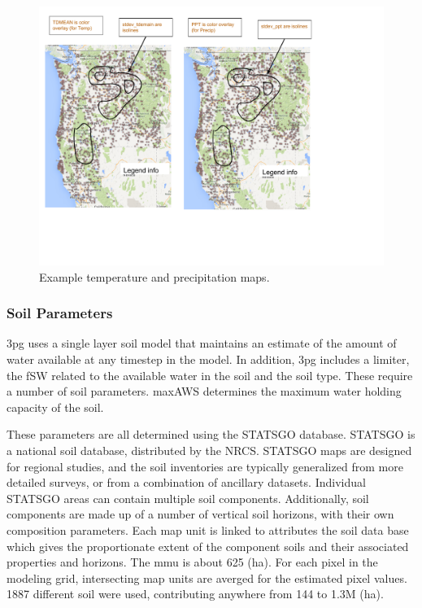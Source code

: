 \documentclass[preprint,12pt]{elsarticle}
\begin{document}
\begin{figure}[hp]
  \centering
  \includegraphics[width=1.0\linewidth]{hart14poplar-model-weather}  
  \caption{Example temperature and precipitation maps.}
  \label{fig:temp}
\end{figure}

\subsubsection{Soil Parameters}
\label{sec:soil}

\ac{3pg} uses a single layer soil model that maintains an estimate of
the amount of water available at any timestep in the model.  In
addition, \ac{3pg} includes a limiter, the \ac{fSW} related to the
available water in the soil and the soil type.  These require a number
of soil parameters.  \ac{maxAWS} determines the maximum water holding
capacity of the soil.  

These parameters are all determined using the \ac{STATSGO} database.
\ac{STATSGO} is a national soil database, distributed by the
\ac{NRCS}.  \ac{STATSGO} maps are designed for regional studies, and
the soil inventories are typically generalized from more detailed
surveys, or from a combination of ancillary datasets.  Individual
\ac{STATSGO} areas can contain multiple soil components.
Additionally, soil components are made up of a number of vertical soil
horizons, with their own composition parameters.  Each map unit is
linked to attributes the soil data base which gives the proportionate
extent of the component soils and their associated properties and
horizons.  The \ac{mmu} is about 625 (ha).  For each pixel in the
modeling grid, intersecting map units are averged for the estimated
pixel values.  1887 different soil were used, contributing anywhere
from 144 to 1.3M (ha).
\end{document}
